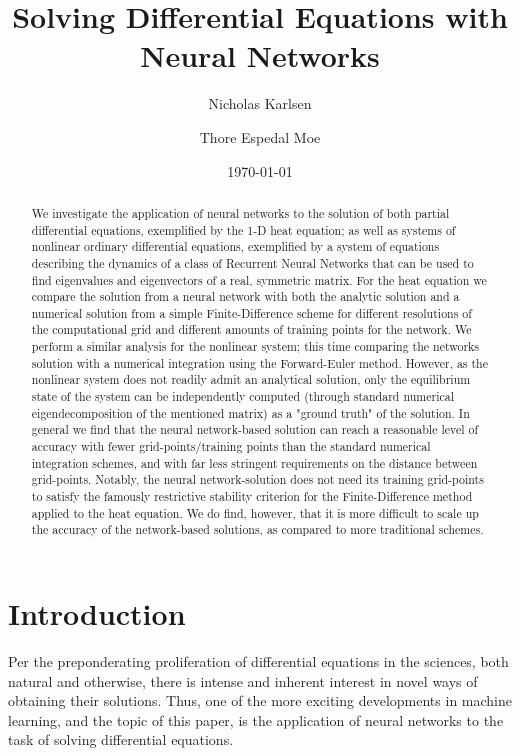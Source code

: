 \documentclass[reprint, english, nofootinbib]{revtex4-2}
\begin{document}
\title{Solving Differential Equations with Neural Networks}
\author{Nicholas Karlsen}
\author{Thore Espedal Moe}
\date{\today}

\begin{abstract}
    \noindent
    We investigate the application of neural networks to the solution of both partial differential equations, exemplified by the 1-D heat equation; as well as systems of nonlinear ordinary differential equations, exemplified by a system of equations describing the dynamics of a class of Recurrent Neural Networks that can be used to find eigenvalues and eigenvectors of a real, symmetric matrix. For the heat equation we compare the solution from a neural network with both the analytic solution and a numerical solution from a simple Finite-Difference scheme for different resolutions of the computational grid and different amounts of training points for the network. We perform a similar analysis for the nonlinear system; this time comparing the networks solution with a numerical integration using the Forward-Euler method. However, as the nonlinear system does not readily admit an analytical solution, only the equilibrium state of the system can be independently computed (through standard numerical eigendecomposition of the mentioned matrix) as a "ground truth" of the solution. In general we find that the neural network-based solution can reach a reasonable level of accuracy with fewer grid-points/training points than the standard numerical integration schemes, and with far less stringent requirements on the distance between grid-points. Notably, the neural network-solution does not need its training grid-points to satisfy the famously restrictive stability criterion for the Finite-Difference method applied to the heat equation. We do find, however, that it is more difficult to scale up the accuracy of the network-based solutions, as compared to more traditional schemes.
\end{abstract}

\maketitle

\section{Introduction}
\noindent
Per the preponderating proliferation of differential equations in the sciences, both natural and otherwise, there is intense and inherent interest in novel ways of obtaining their solutions. Thus, one of the more exciting developments in machine learning, and the topic of this paper, is the application of neural networks to the task of solving differential equations. 
\end{document}

